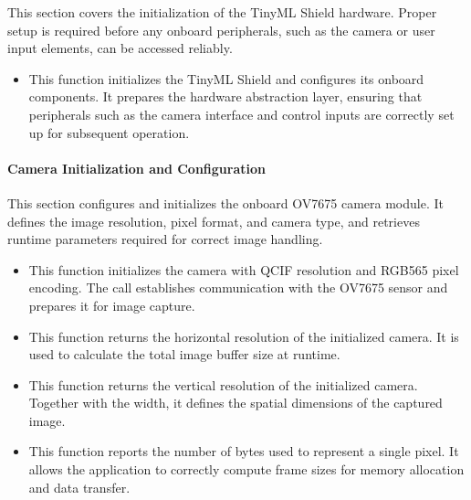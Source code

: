 This section covers the initialization of the TinyML Shield hardware. Proper setup is required before any onboard peripherals, such as the camera or user input elements, can be accessed reliably.

\begin{itemize}
	\item {} 
	
	This function initializes the TinyML Shield and configures its onboard components. It prepares the hardware abstraction layer, ensuring that peripherals such as the camera interface and control inputs are correctly set up for subsequent operation.
\end{itemize}


\paragraph{Camera Initialization and Configuration}

This section configures and initializes the onboard OV7675 camera module. It defines the image resolution, pixel format, and camera type, and retrieves runtime parameters required for correct image handling.

\begin{itemize}
	\item {} 
	
	This function initializes the camera with QCIF resolution and RGB565 pixel encoding. The call establishes communication with the OV7675 sensor and prepares it for image capture.
	
	\item {} 
	
	This function returns the horizontal resolution of the initialized camera. It is used to calculate the total image buffer size at runtime.
	
	\item {} 
	
	This function returns the vertical resolution of the initialized camera. Together with the width, it defines the spatial dimensions of the captured image.
	
	\item {} 
	
	This function reports the number of bytes used to represent a single pixel. It allows the application to correctly compute frame sizes for memory allocation and data transfer.
\end{itemize}



